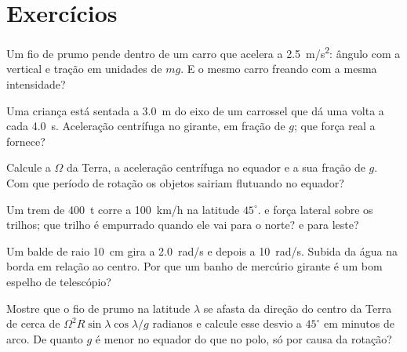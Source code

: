 \section{Exercícios}

\begin{exercise}[$\star$]\label{exo:b1:non-inertial-frames:1}
Um fio de prumo pende dentro de um carro que acelera a \qty{2.5}{m/s^2}:
ângulo com a vertical e tração em unidades de $mg$. E o mesmo carro
freando com a mesma intensidade?
\end{exercise}

\begin{exercise}[$\star$]\label{exo:b1:non-inertial-frames:2}
Uma criança está sentada a \qty{3.0}{m} do eixo de um carrossel que dá uma
volta a cada \qty{4.0}{s}. Aceleração centrífuga no  girante, em
fração de $g$; que força real a fornece?
\end{exercise}

\begin{exercise}[$\star$]\label{exo:b1:non-inertial-frames:3}
Calcule a  $\Omega$ da Terra, a aceleração centrífuga no
equador e a sua fração de $g$. Com que período de rotação os objetos
sairiam flutuando no equador?
\end{exercise}

\begin{exercise}[$\star$]\label{exo:b1:non-inertial-frames:4}
Um trem de \qty{400}{t} corre a \qty{100}{km/h} na latitude $45^\circ$.
 e força lateral sobre os trilhos; que trilho é
empurrado quando ele vai para o norte? e para leste?
\end{exercise}

\begin{exercise}[$\star\star$]\label{exo:b1:non-inertial-frames:5}
Um balde de raio \qty{10}{cm} gira a \qty{2.0}{rad/s} e depois a
\qty{10}{rad/s}. Subida da água na borda em relação ao centro. Por que um
banho de mercúrio girante é um bom espelho de telescópio?
\end{exercise}

\begin{exercise}[$\star\star$]\label{exo:b1:non-inertial-frames:6}
Mostre que o fio de prumo na latitude $\lambda$ se afasta da direção do
centro da Terra de cerca de $\Omega^2R\sin\lambda\cos\lambda/g$ radianos e
calcule esse desvio a $45^\circ$ em minutos de arco. De quanto $g$ é menor
no equador do que no polo, só por causa da rotação?
\end{exercise}

